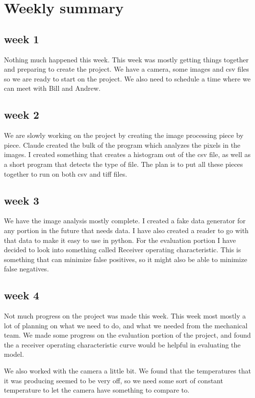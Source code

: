 \documentclass[onecolumn, draftclsnofoot,10pt, compsoc]{IEEEtran}
\begin{document}
\section{Weekly summary}
\subsection{week 1}
Nothing much happened this week. This week was mostly getting things together and preparing to create the project. We have a camera, some images and csv files so we are ready to start on the project. We also need to schedule a time where we can meet with Bill and Andrew.

\subsection{week 2}
We are slowly working on the project by creating the image processing piece by piece. Claude created the bulk of the program which analyzes the pixels in the images. I created something that creates a histogram out of the csv file, as well as a short program that detects the type of file. The plan is to put all these pieces together to run on both csv and tiff files.
\subsection{week 3}
We have the image analysis mostly complete. I created a fake data generator for any portion in the future that needs data. I have also created a reader to go with that data to make it easy to use in python. For the evaluation portion I have decided to look into something called Receiver operating characteristic. This is something that can minimize false positives, so it might also be able to minimize false negatives.
\subsection{week 4}
Not much progress on the project was made this week. This week most mostly a lot of planning on what we need to do, and what we needed from the mechanical team. We made some progress on the evaluation portion of the project, and found the a receiver operating characteristic curve would be helpful in evaluating the model.
 
We also worked with the camera a little bit. We found that the temperatures that it was producing seemed to be very off, so we need some sort of constant temperature to let the camera have something to compare to.
\end{document}
